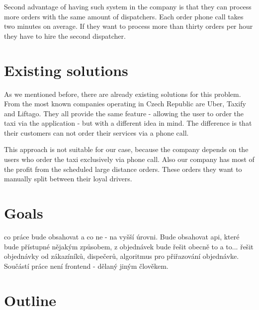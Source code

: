 Second advantage of having such system in the company is that they can process more orders with the same amount of dispatchers. Each order phone call takes two minutes on average. If they want to process more than thirty orders per hour they have to hire the second dispatcher.


\section{Existing solutions}
As we mentioned before, there are already existing solutions for this problem. From the most known companies operating in Czech Republic are Uber, Taxify and Liftago. They all provide the same feature - allowing the user to order the taxi via the application - but with a different idea in mind. The difference is that their customers can not order their services via a phone call. 

This approach is not suitable for our case, because the company depends on the users who order the taxi exclusively via phone call. Also our company has most of the profit from the scheduled large distance orders. These orders they want to manually split between their loyal drivers. 

\section{Goals}
co práce bude obsahovat a co ne - na vyšší úrovni. Bude obsahovat api, které bude přístupné nějakým způsobem, z objednávek bude řešit obecně to a to... řešit objednávky od zákazíníků, dispečerů, algoritmus pro přiřazování objednávke. Součástí práce není frontend - dělaný jiným člověkem. 


\section{Outline}

